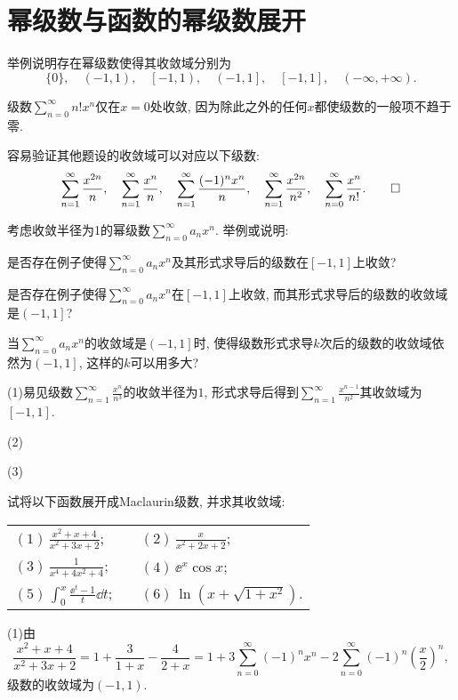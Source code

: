 \section{幂级数与函数的幂级数展开}
\begin{quiza}
\woe 举例说明存在幂级数使得其收敛域分别为\[\{0\},\quad\left(-1,1\right),\quad\left[-1,1\right),\quad\left(-1,1\right],\quad\left[-1,1\right],\quad\left(-\infty,+\infty\right).\]
\begin{solution}
级数\(\sum_{n=0}^{\infty}n!x^n\)仅在\(x=0\)处收敛, 因为除此之外的任何\(x\)都使级数的一般项不趋于零.

容易验证其他题设的收敛域可以对应以下级数:\[\sum_{n=1}^{\infty}\frac{x^{2n}}{n},\quad\sum_{n=1}^{\infty}\frac{x^{n}}{n},\quad\sum_{n=1}^{\infty}\frac{(-1)^nx^{n}}{n},\quad\sum_{n=1}^{\infty}\frac{x^{2n}}{n^2},\quad\sum_{n=0}^{\infty}\frac{x^{n}}{n!}.\qedhere\]
\end{solution}
\woe 考虑收敛半径为1的幂级数\(\sum_{n=0}^{\infty}a_nx^n\). 举例或说明:\begin{compactenum}[(1)]
\item 是否存在例子使得\(\sum_{n=0}^{\infty}a_nx^n\)及其形式求导后的级数在\([-1,1]\)上收敛?
\item 是否存在例子使得\(\sum_{n=0}^{\infty}a_nx^n\)在\([-1,1]\)上收敛, 而其形式求导后的级数的收敛域是\(\left(-1,1\right]\)?
\item 当\(\sum_{n=0}^{\infty}a_nx^n\)的收敛域是\(\left(-1,1\right]\)时, 使得级数形式求导\(k\)次后的级数的收敛域依然为\(\left(-1,1\right]\), 这样的\(k\)可以用多大?
\end{compactenum}
\begin{solution}
(1)易见级数\(\sum_{n=1}^{\infty}\frac{x^n}{n^3}\)的收敛半径为\(1\), 形式求导后得到\(\sum_{n=1}^{\infty}\frac{x^{n-1}}{n^2}\)其收敛域为\([-1,1]\).

(2)

(3)
\end{solution}
\woe 试将以下函数展开成Maclaurin级数, 并求其收敛域:\vspace{8pt}\\
\begin{tabular}{lcl}
\((1)\,\frac{x^2+x+4}{x^2+3x+2}\);&\qquad\qquad&\((2)\,\frac{x}{x^2+2x+2}\);\vspace{0.3cm}\\
\((3)\,\frac{1}{x^4+4x^2+4}\);&&\((4)\,\ee^x\cos x\);\vspace{0.3cm}\\
\((5)\,\int_{0}^{x}\frac{\ee^t-1}{t}\dd t\);&&\((6)\,\ln(x+\sqrt{1+x^2})\).\vspace{0.3cm}\\
\end{tabular}
\begin{solution}
(1)由\[\frac{x^2+x+4}{x^2+3x+2}=1+\frac{3}{1+x}-\frac{4}{2+x}=1+3\sum_{n=0}^{\infty}(-1)^nx^n-2\sum_{n=0}^{\infty}(-1)^n\left(\frac{x}{2}\right)^n,\]级数的收敛域为\((-1,1)\).


\end{solution}
\end{quiza}
